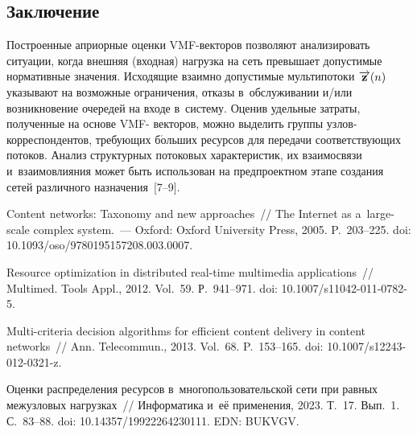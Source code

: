 \begin{multicols}{2}
\vspace*{-9pt}

\section{Заключение }

\vspace*{-3pt}

Построенные априорные оценки VMF-век\-то\-ров позволяют анализировать ситуации, 
когда внешняя (входная) нагрузка на сеть превышает допустимые нормативные 
значения. Исходящие взаимно допустимые мультипотоки  $\overrightarrow{\mathbf{z}}(n)$ 
указывают на возможные ограничения, отказы в~обслуживании и/или возникновение 
очередей на входе в~сис\-те\-му. Оценив удельные затраты, полученные на основе VMF-
векторов, можно выделить группы уз\-лов-кор\-рес\-пон\-ден\-тов, требующих б$\acute{\mbox{о}}$льших 
ресурсов для передачи соответствующих потоков. Анализ структурных потоковых 
характеристик, их взаимосвязи и~взаимовлияния может быть использован на 
предпроектном этапе создания сетей различного назначения~[7--9].


\vspace*{-9pt}

{\small\frenchspacing
 { %
 \begin{thebibliography}{9}
 
\vspace*{-2pt}
 
 Content networks: Taxonomy 
and new approaches~// The Internet as a~large-scale complex system.~--- Oxford: 
Oxford University Press,    2005. P.~203--225. doi: 10.1093/oso/9780195157208.003.0007.

Resource optimization in distributed real-time multimedia applications~// 
Multimed. Tools Appl., 2012. Vol.~59. Р.~941--971. doi: 10.1007/s11042-011-0782-5.

 Multi-criteria decision algorithms for efficient content delivery 
in content networks~// Ann. Telecommun., 2013. Vol.~68.  P.~153--165.
doi: 10.1007/s12243-012-0321-z.
    
 Оценки 
распределения ресурсов в~многопользовательской сети при равных межузловых 
нагрузках~// Информатика и~её применения, 2023. Т.~17. Вып.~1. С.~83--88.
doi: 10.14357/19922264230111. EDN: BUKVGV.


\end{thebibliography}}}
\end{multicols}
